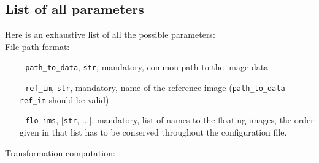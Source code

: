 \documentclass[10pt,a4paper]{book}
\begin{document}
\subsection{List of all parameters}
Here is an exhaustive list of all the possible parameters:\\
File path format:
\begin{enumerate}
\item[-] \texttt{path\_to\_data}, \texttt{str}, mandatory, common path to the image data
\item[-] \texttt{ref\_im}, \texttt{str}, mandatory, name of the reference image (\texttt{path\_to\_data} + \texttt{ref\_im} should be valid)
\item[-] \texttt{flo\_ims}, [\texttt{str}, ...], mandatory, list of names to the floating images, the order given in that list has to be conserved throughout the configuration file.
\end{enumerate}
Transformation computation:
\end{document}
